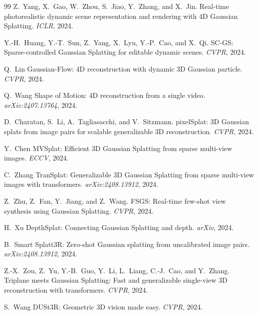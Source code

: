 \begin{thebibliography}{99}
Z.~Yang, X.~Gao, W.~Zhou, S.~Jiao, Y.~Zhang, and X.~Jin.
Real-time photorealistic dynamic scene representation and rendering with 4D
Gaussian Splatting.
\emph{ICLR}, 2024.


Y.-H.~Huang, Y.-T.~Sun, Z.~Yang, X.~Lyu, Y.-P.~Cao, and X.~Qi.
SC-GS: Sparse-controlled Gaussian Splatting for editable dynamic scenes.
\emph{CVPR}, 2024.


Q.~Lin \etal
Gaussian-Flow: 4D reconstruction with dynamic 3D Gaussian particle.
\emph{CVPR}, 2024.


Q.~Wang \etal
Shape of Motion: 4D reconstruction from a single video.
\emph{arXiv:2407.13764}, 2024.


D.~Charatan, S.~Li, A.~Tagliasacchi, and V.~Sitzmann.
pixelSplat: 3D Gaussian splats from image pairs for scalable generalizable
3D reconstruction.
\emph{CVPR}, 2024.


Y.~Chen \etal
MVSplat: Efficient 3D Gaussian Splatting from sparse multi-view images.
\emph{ECCV}, 2024.


C.~Zhang \etal
TranSplat: Generalizable 3D Gaussian Splatting from sparse multi-view images
with transformers.
\emph{arXiv:2408.13912}, 2024.


Z.~Zhu, Z.~Fan, Y.~Jiang, and Z.~Wang.
FSGS: Real-time few-shot view synthesis using Gaussian Splatting.
\emph{CVPR}, 2024.


H.~Xu \etal
DepthSplat: Connecting Gaussian Splatting and depth.
\emph{arXiv}, 2024.


B.~Smart \etal
Splatt3R: Zero-shot Gaussian splatting from uncalibrated image pairs.
\emph{arXiv:2408.13912}, 2024.


Z.-X.~Zou, Z.~Yu, Y.-B.~Guo, Y.~Li, L.~Liang, C.-J.~Cao, and Y.~Zhang.
Triplane meets Gaussian Splatting: Fast and generalizable single-view 3D
reconstruction with transformers.
\emph{CVPR}, 2024.


S.~Wang \etal
DUSt3R: Geometric 3D vision made easy.
\emph{CVPR}, 2024.



\end{thebibliography}
